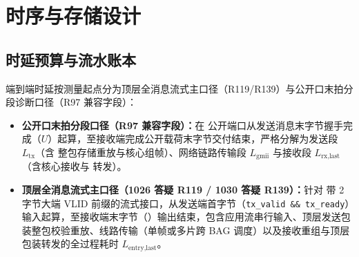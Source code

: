 \chapter{时序与存储设计}\label{ch:timing}

\section{时延预算与流水账本}\label{sec:latbudget}

端到端时延按测量起点分为顶层全消息流式主口径（R119/R139）与公开口末拍分段诊断口径（R97 兼容字段）：
\begin{itemize}[leftmargin=2em,itemsep=1pt]
  \item \textbf{公开口末拍分段口径（R97 兼容字段）：}在  公开端口从发送消息末字节握手完成（$U$）起算，至接收端完成公开载荷末字节交付结束，严格分解为发送段 $L_\text{tx}$（含  整包存储重放与核心组帧）、网络链路传输段 $L_\text{gmii}$ 与接收段 $L_\text{rx,last}$（含核心接收与  转发）。
  \item \textbf{顶层全消息流式主口径（1026 答疑 R119 / 1030 答疑 R139）：}针对  带 2 字节大端 VLID 前缀的流式接口，从发送端首字节（\texttt{tx\_valid \&\& tx\_ready}）输入起算，至接收端末字节（）输出结束，包含应用流串行输入、顶层发送包装整包校验重放、线路传输（单帧或多片跨 BAG 调度）以及接收重组与顶层包装转发的全过程耗时 $L_\text{entry,last}$。
\end{itemize}

